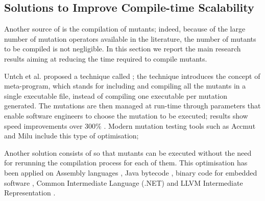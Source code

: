 
\subsection{Solutions to Improve Compile-time Scalability}
\label{sub:compileTime}
\label{sec:opt:selection}

Another source of  is the compilation of mutants;
indeed, because of the large number of mutation operators available in the literature, the number of mutants to be compiled is not negligible. In this section we report the main research results aiming at reducing the time required to compile mutants.

Untch et al. \cite{untch1993mutation} proposed a technique called ; the technique introduces the concept of meta-program, which stands for including and compiling all the mutants in a single executable file, instead of compiling one executable per mutation generated. The mutations are then managed at run-time through parameters that enable software engineers to choose the mutation to be executed; results show speed improvements over 300\% \cite{untch1993mutation,papadakis2010automatic}. Modern mutation testing tools such as Accmut \cite{wang2017faster} and Milu \cite{jia2008milu} include this type of optimisation; 

Another solution consists of  so that mutants can be executed without the need for rerunning the compilation process for each of them.
This optimisation has been applied on 
Assembly languages \cite{crouzet2006sesame},
Java bytecode \cite{ma2006mujava}, 
binary code for embedded software \cite{becker2012xemu},
Common Intermediate Language (.NET) \cite{derezinska2011object} 
and LLVM Intermediate Representation \cite{hariri2016evaluating}. 



